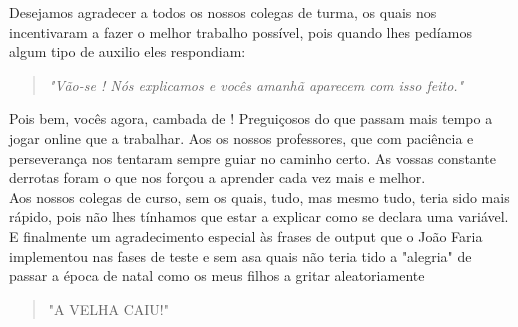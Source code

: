 \agradecimentos
Desejamos agradecer a todos os nossos colegas de turma, os quais nos incentivaram a fazer o melhor trabalho possível, pois quando lhes pedíamos algum tipo de auxilio eles respondiam:
\begin{quotation}
	\textit{"Vão-se ! Nós explicamos e vocês amanhã aparecem com isso feito."}
\end{quotation} 

Pois bem,  vocês agora, cambada de ! Preguiçosos do  que passam mais tempo a jogar online que a trabalhar.
Aos os nossos professores, que com paciência e perseverança nos tentaram sempre guiar no caminho certo. As vossas constante derrotas foram o que nos forçou a aprender cada vez mais e melhor.\\
\newline
Aos nossos colegas de curso, sem os quais, tudo, mas mesmo tudo, teria sido mais rápido, pois não lhes tínhamos que estar a explicar como se declara uma variável.\\
\newline
E finalmente um agradecimento especial às frases de output que o João Faria implementou nas fases de teste e sem asa quais não teria tido a "alegria" de passar a época de natal como os meus filhos a gritar aleatoriamente \begin{quote}"A VELHA CAIU!"\end{quote}